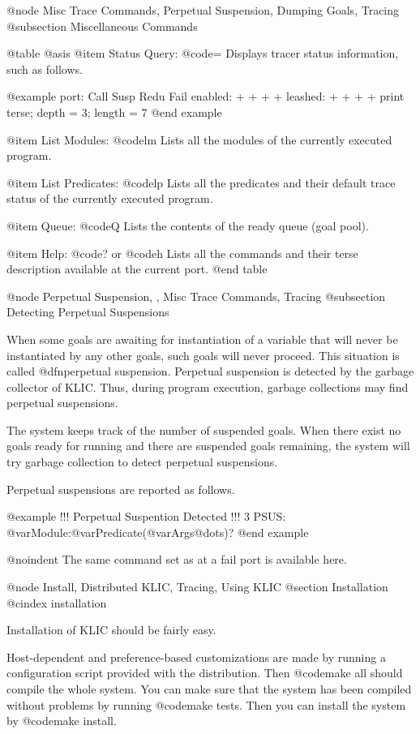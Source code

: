 {{{{@node Misc Trace Commands, Perpetual Suspension, Dumping Goals, Tracing
@subsection Miscellaneous Commands

@table @asis
@item  Status Query: @code{=}
Displays tracer status information, such as follows.

@example
   port: Call Susp Redu Fail
enabled:  +    +    +    +
leashed:  +    +    +    +
print terse; depth = 3; length = 7
@end example

@item List Modules: @code{lm}
Lists all the modules of the currently executed program.

@item List Predicates: @code{lp}
Lists all the predicates and their default trace status of the currently
executed program.

@item  Queue: @code{Q}
Lists the contents of the ready queue (goal pool).

@item Help: @code{?} or @code{h}
Lists all the commands and their terse description available at the
current port.
@end table

@node Perpetual Suspension,  , Misc Trace Commands, Tracing
@subsection Detecting Perpetual Suspensions

When some goals are awaiting for instantiation of a variable that will
never be instantiated by any other goals, such goals will never proceed.
This situation is called @dfn{perpetual suspension}.  Perpetual
suspension is detected by the garbage collector of KLIC.  Thus, during
program execution, garbage collections may find perpetual suspensions.

The system keeps track of the number of suspended goals.  When there
exist no goals ready for running and there are suspended goals
remaining, the system will try garbage collection to detect perpetual
suspensions.

Perpetual suspensions are reported as follows.

@example
!!! Perpetual Suspention Detected !!!
   3 PSUS: @var{Module}:@var{Predicate}(@var{Args}@dots{})? 
@end example

@noindent
The same command set as at a fail port is available here.

@node Install, Distributed KLIC, Tracing, Using KLIC
@section Installation
@cindex installation

Installation of KLIC should be fairly easy.

Host-dependent and preference-based customizations are made by running a
configuration script provided with the distribution.  Then @code{make
all} should compile the whole system.  You can make sure that the system
has been compiled without problems by running @code{make tests}.  Then
you can install the system by @code{make install}.

}}}}
